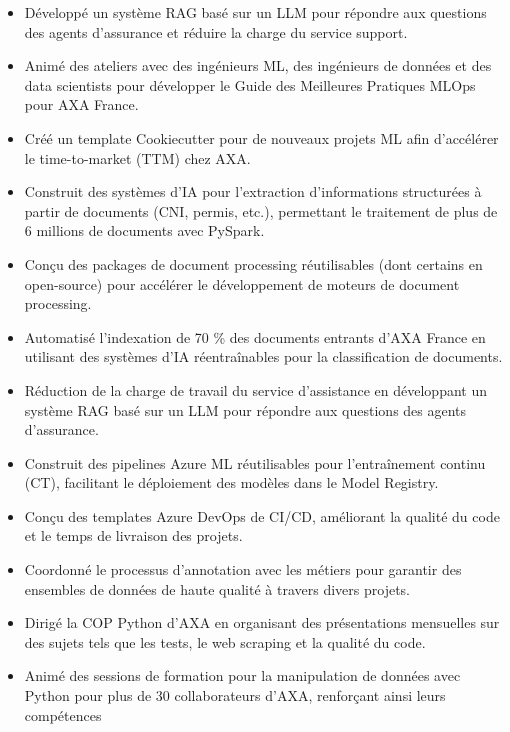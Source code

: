 \documentclass[10pt,letter,ragged2e,withhyper]{altacv}
\begin{document}
\begin{paracol}{2}



\begin{itemize}
  \item Développé un système RAG basé sur un LLM pour répondre aux questions des agents d'assurance et réduire la charge du service support.
  \item Animé des ateliers avec des ingénieurs ML, des ingénieurs de données et des data scientists pour développer le Guide des Meilleures Pratiques MLOps pour AXA France.
  \item Créé un template Cookiecutter pour de nouveaux projets ML afin d'accélérer le time-to-market (TTM) chez AXA.
  \item Construit des systèmes d'IA pour l'extraction d'informations structurées à partir de documents (CNI, permis, etc.), permettant le traitement de plus de 6 millions de documents avec PySpark.
  \item Conçu des packages de document processing réutilisables (dont certains en open-source) pour accélérer le développement de moteurs de document processing.
  \item Automatisé l'indexation de 70 \% des documents entrants d'AXA France en utilisant des systèmes d'IA réentraînables pour la classification de documents.
  \item Réduction de la charge de travail du service d'assistance en développant un système RAG basé sur un LLM pour répondre aux questions des agents d'assurance.
  \item Construit des pipelines Azure ML réutilisables pour l'entraînement continu (CT), facilitant le déploiement des modèles dans le Model Registry.
  \item Conçu des templates Azure DevOps de CI/CD, améliorant la qualité du code et le temps de livraison des projets.
  \item Coordonné le processus d'annotation avec les métiers pour garantir des ensembles de données de haute qualité à travers divers projets.
  \item Dirigé la COP Python d'AXA en organisant des présentations mensuelles sur des sujets tels que les tests, le web scraping et la qualité du code.
  \item Animé des sessions de formation pour la manipulation de données avec Python pour plus de 30 collaborateurs d'AXA, renforçant ainsi leurs compétences
\end{itemize}


\end{paracol}
\end{document}
